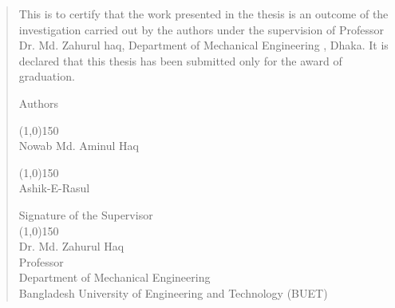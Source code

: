 \begin{SingleSpace}
\begin{quote}
\large {This is to certify that the work presented in the thesis is an outcome of the investigation carried out by the authors under the supervision of Professor Dr. Md. Zahurul haq, Department of Mechanical Engineering , Dhaka. It is declared that this thesis has been submitted only for the award of graduation.} 
\vspace{1cm}
\begin{center}
\large{Authors}
\end{center}
\vspace{15mm}
%
\begin{minipage}{5cm}
    \centering
    \line(1,0){150}\\
    \large {Nowab Md. Aminul Haq}\\
    
\end{minipage}
\hspace{4cm}
\begin{minipage}{5cm}
    \centering
    \line(1,0){150}\\
    \large {Ashik-E-Rasul}\\
    
\end{minipage}
%
\vspace{10mm}
\begin{center}
\large{Signature of the Supervisor}\\
\vspace{10mm}
\line(1,0){150}\\
\large {Dr. Md. Zahurul Haq}\\
\vspace{2mm}
\large {Professor}\\
\large {Department of Mechanical Engineering }\\
\large {Bangladesh University of Engineering and Technology (BUET) }\\
\end{center}
%


\end{quote}
\end{SingleSpace}
